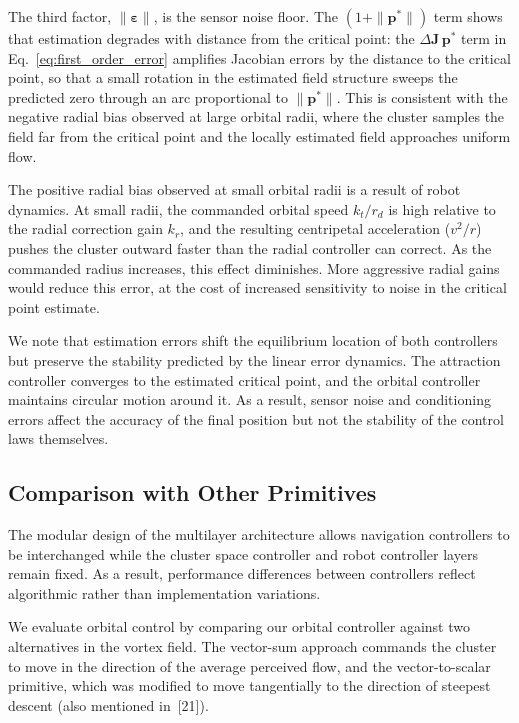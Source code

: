 \documentclass[lettersize,journal]{IEEEtran}
\begin{document}
The third factor, $\|\boldsymbol{\varepsilon}\|$, is the sensor noise floor. The $(1 + \|\mathbf{p}^*\|)$ term shows that estimation degrades with distance from the critical point: the $\Delta\mathbf{J}\,\mathbf{p}^*$ term in Eq.~\eqref{eq:first_order_error} amplifies Jacobian errors by the distance to the critical point, so that a small rotation in the estimated field structure sweeps the predicted zero through an arc proportional to $\|\mathbf{p}^*\|$. This is consistent with the negative radial bias observed at large orbital radii, where the cluster samples the field far from the critical point and the locally estimated field approaches uniform flow.

The positive radial bias observed at small orbital radii is a result of robot dynamics. At small radii, the commanded orbital speed $k_t / r_d$ is high relative to the radial correction gain $k_r$, and the resulting centripetal acceleration ($v^2 / r$) pushes the cluster outward faster than the radial controller can correct. As the commanded radius increases, this effect diminishes. More aggressive radial gains would reduce this error, at the cost of increased sensitivity to noise in the critical point estimate.

We note that estimation errors shift the equilibrium location of both controllers but preserve the stability predicted by the linear error dynamics. The attraction controller converges to the estimated critical point, and the orbital controller maintains circular motion around it. As a result, sensor noise and conditioning errors affect the accuracy of the final position but not the stability of the control laws themselves.

\subsection{Comparison with Other Primitives}

The modular design of the multilayer architecture allows navigation controllers to be interchanged while the cluster space controller and robot controller layers remain fixed. As a result, performance differences between controllers reflect algorithmic rather than implementation variations.

We evaluate orbital control by comparing our orbital controller against two alternatives in the vortex field. The vector-sum approach
commands the cluster to move in the direction of the average perceived flow, and the vector-to-scalar primitive, which was modified to move tangentially to the direction of steepest descent (also mentioned in~[21]).
\end{document}
